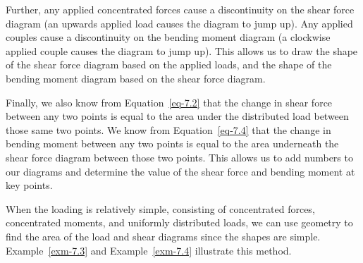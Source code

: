 \documentclass[
  letterpaper,
  DIV=11,
  numbers=noendperiod]{scrreprt}
\theoremstyle{definition}
\theoremstyle{remark}
\begin{document}
Further, any applied concentrated forces cause a discontinuity on the
shear force diagram (an upwards applied load causes the diagram to jump
up). Any applied couples cause a discontinuity on the bending moment
diagram (a clockwise applied couple causes the diagram to jump up). This
allows us to draw the shape of the shear force diagram based on the
applied loads, and the shape of the bending moment diagram based on the
shear force diagram.

Finally, we also know from Equation~\ref{eq-7.2} that the change in
shear force between any two points is equal to the area under the
distributed load between those same two points. We know from
Equation~\ref{eq-7.4} that the change in bending moment between any two
points is equal to the area underneath the shear force diagram between
those two points. This allows us to add numbers to our diagrams and
determine the value of the shear force and bending moment at key points.

When the loading is relatively simple, consisting of concentrated
forces, concentrated moments, and uniformly distributed loads, we can
use geometry to find the area of the load and shear diagrams since the
shapes are simple. Example~\ref{exm-7.3} and Example~\ref{exm-7.4}
illustrate this method.
\end{document}
